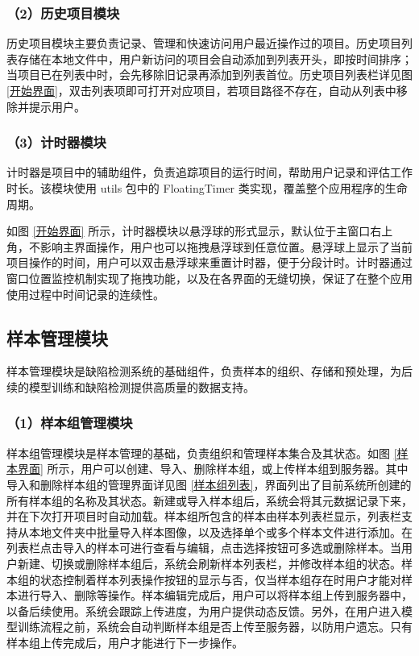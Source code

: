 \documentclass[
  ]{njuthesis}
\begin{document}
\subsubsection{（2）历史项目模块}

历史项目模块主要负责记录、管理和快速访问用户最近操作过的项目。历史项目列表存储在本地文件中，用户新访问的项目会自动添加到列表开头，即按时间排序；当项目已在列表中时，会先移除旧记录再添加到列表首位。历史项目列表栏详见图 \ref{开始界面}，双击列表项即可打开对应项目，若项目路径不存在，自动从列表中移除并提示用户。

\subsubsection{（3）计时器模块}

计时器是项目中的辅助组件，负责追踪项目的运行时间，帮助用户记录和评估工作时长。该模块使用 utils 包中的 FloatingTimer 类实现，覆盖整个应用程序的生命周期。

如图 \ref{开始界面} 所示，计时器模块以悬浮球的形式显示，默认位于主窗口右上角，不影响主界面操作，用户也可以拖拽悬浮球到任意位置。悬浮球上显示了当前项目操作的时间，用户可以双击悬浮球来重置计时器，便于分段计时。计时器通过窗口位置监控机制实现了拖拽功能，以及在各界面的无缝切换，保证了在整个应用使用过程中时间记录的连续性。

\subsection{样本管理模块}

样本管理模块是缺陷检测系统的基础组件，负责样本的组织、存储和预处理，为后续的模型训练和缺陷检测提供高质量的数据支持。

\subsubsection{（1）样本组管理模块}

样本组管理模块是样本管理的基础，负责组织和管理样本集合及其状态。如图 \ref{样本界面} 所示，用户可以创建、导入、删除样本组，或上传样本组到服务器。其中导入和删除样本组的管理界面详见图 \ref{样本组列表}，界面列出了目前系统所创建的所有样本组的名称及其状态。新建或导入样本组后，系统会将其元数据记录下来，并在下次打开项目时自动加载。样本组所包含的样本由样本列表栏显示，列表栏支持从本地文件夹中批量导入样本图像，以及选择单个或多个样本文件进行添加。在列表栏点击导入的样本可进行查看与编辑，点击选择按钮可多选或删除样本。当用户新建、切换或删除样本组后，系统会刷新样本列表栏，并修改样本组的状态。样本组的状态控制着样本列表操作按钮的显示与否，仅当样本组存在时用户才能对样本进行导入、删除等操作。样本编辑完成后，用户可以将样本组上传到服务器中，以备后续使用。系统会跟踪上传进度，为用户提供动态反馈。另外，在用户进入模型训练流程之前，系统会自动判断样本组是否上传至服务器，以防用户遗忘。只有样本组上传完成后，用户才能进行下一步操作。
\end{document}
